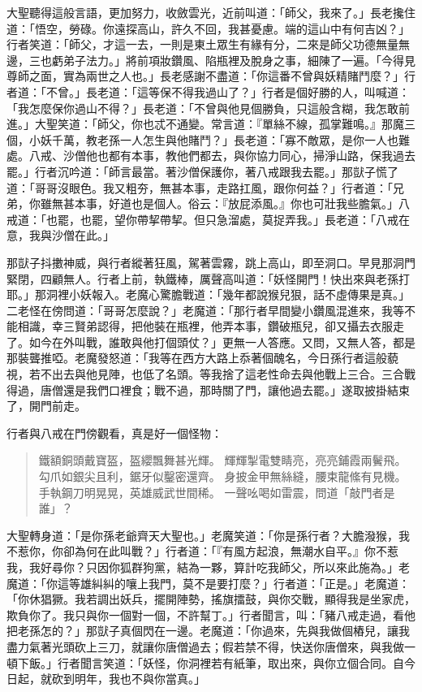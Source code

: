 大聖聽得這般言語，更加努力，收斂雲光，近前叫道：「師父，我來了。」長老攙住道：「悟空，勞碌。你遠探高山，許久不回，我甚憂慮。端的這山中有何吉凶？」行者笑道：「師父，才這一去，一則是東土眾生有緣有分，二來是師父功德無量無邊，三也虧弟子法力。」將前項妝鑽風、陷瓶裡及脫身之事，細陳了一遍。「今得見尊師之面，實為兩世之人也。」長老感謝不盡道：「你這番不曾與妖精賭鬥麼？」行者道：「不曾。」長老道：「這等保不得我過山了？」行者是個好勝的人，叫喊道：「我怎麼保你過山不得？」長老道：「不曾與他見個勝負，只這般含糊，我怎敢前進。」大聖笑道：「師父，你也忒不通變。常言道：『單絲不線，孤掌難鳴。』那魔三個，小妖千萬，教老孫一人怎生與他賭鬥？」長老道：「寡不敵眾，是你一人也難處。八戒、沙僧他也都有本事，教他們都去，與你協力同心，掃淨山路，保我過去罷。」行者沉吟道：「師言最當。著沙僧保護你，著八戒跟我去罷。」那獃子慌了道：「哥哥沒眼色。我又粗夯，無甚本事，走路扛風，跟你何益？」行者道：「兄弟，你雖無甚本事，好道也是個人。俗云：『放屁添風。』你也可壯我些膽氣。」八戒道：「也罷，也罷，望你帶挈帶挈。但只急溜處，莫捉弄我。」長老道：「八戒在意，我與沙僧在此。」

那獃子抖擻神威，與行者縱著狂風，駕著雲霧，跳上高山，即至洞口。早見那洞門緊閉，四顧無人。行者上前，執鐵棒，厲聲高叫道：「妖怪開門！快出來與老孫打耶。」那洞裡小妖報入。老魔心驚膽戰道：「幾年都說猴兒狠，話不虛傳果是真。」二老怪在傍問道：「哥哥怎麼說？」老魔道：「那行者早間變小鑽風混進來，我等不能相識，幸三賢弟認得，把他裝在瓶裡，他弄本事，鑽破瓶兒，卻又攝去衣服走了。如今在外叫戰，誰敢與他打個頭仗？」更無一人答應。又問，又無人答，都是那裝聾推啞。老魔發怒道：「我等在西方大路上忝著個醜名，今日孫行者這般藐視，若不出去與他見陣，也低了名頭。等我捨了這老性命去與他戰上三合。三合戰得過，唐僧還是我們口裡食；戰不過，那時關了門，讓他過去罷。」遂取披掛結束了，開門前走。

行者與八戒在門傍觀看，真是好一個怪物：
\begin{quote}
鐵額銅頭戴寶盔，盔纓飄舞甚光輝。
輝輝掣電雙睛亮，亮亮鋪霞兩鬢飛。
勾爪如銀尖且利，鋸牙似鑿密還齊。
身披金甲無絲縫，腰束龍絛有見機。
手執鋼刀明晃晃，英雄威武世間稀。
一聲吆喝如雷震，問道「敲門者是誰」？
\end{quote}

大聖轉身道：「是你孫老爺齊天大聖也。」老魔笑道：「你是孫行者？大膽潑猴，我不惹你，你卻為何在此叫戰？」行者道：「『有風方起浪，無潮水自平。』你不惹我，我好尋你？只因你狐群狗黨，結為一夥，算計吃我師父，所以來此施為。」老魔道：「你這等雄糾糾的嚷上我門，莫不是要打麼？」行者道：「正是。」老魔道：「你休猖獗。我若調出妖兵，擺開陣勢，搖旗擂鼓，與你交戰，顯得我是坐家虎，欺負你了。我只與你一個對一個，不許幫丁。」行者聞言，叫：「豬八戒走過，看他把老孫怎的？」那獃子真個閃在一邊。老魔道：「你過來，先與我做個樁兒，讓我盡力氣著光頭砍上三刀，就讓你唐僧過去；假若禁不得，快送你唐僧來，與我做一頓下飯。」行者聞言笑道：「妖怪，你洞裡若有紙筆，取出來，與你立個合同。自今日起，就砍到明年，我也不與你當真。」

